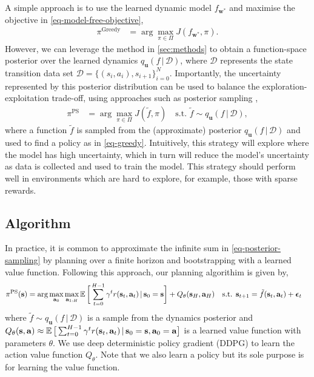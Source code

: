 \documentclass{article}
\newcommand{\state}{\ensuremath{\mathbf{s}}}
\newcommand{\action}{\ensuremath{\mathbf{a}}}
\newcommand{\noise}{\ensuremath{\bm\epsilon}}
\newcommand{\dataset}{\ensuremath{\mathcal{D}}}
\newcommand{\Horizon}{\ensuremath{H}}
\newcommand{\transitionFn}{\ensuremath{f}}
\newcommand{\policy}{\ensuremath{\pi}}
\renewcommand{\mid}{\,|\,}
\begin{document}
A simple approach is to use the learned dynamic model $f_{\mathbf{w}^{*}}$ and maximise the objective in \cref{eq-model-free-objective},
\begin{align} \label{eq-greedy}
  \policy^{\text{Greedy}} &= \arg \max_{\pi \in \Pi} J(f_{\mathbf{w}^{*}}, \pi).
\end{align}
However, we can leverage the method in \cref{sec:methods} to obtain a function-space posterior over the learned dynamics $q_{\mathbf{u}}(\transitionFn \mid \dataset)$,
where $\mathcal{D}$ represents the state transition data set \(\mathcal{D} = \{(s_{i},a_{i}), s_{i+1}\}_{i=0}^{N}\).
Importantly, the uncertainty represented by this posterior distribution can be used to balance the exploration-exploitation trade-off,
using approaches such as posterior sampling \cite{osbandWhyPosteriorSampling2017,osbandMoreEfficientReinforcement2013},
\begin{align} \label{eq-posterior-sampling}
  \policy^{\text{PS}} &= \arg \max_{\pi \in \Pi} J(\tilde{f}, \pi)
\quad \text{s.t. } \tilde{\transitionFn} \sim q_{\mathbf{u}}({\transitionFn} \mid \dataset),
\end{align}
where a function $\tilde{\transitionFn}$ is sampled from the (approximate) posterior $q_{\mathbf{u}}({\transitionFn} \mid \dataset)$ and used to find a policy as
in \cref{eq-greedy}.
Intuitively, this strategy will explore where the model has high uncertainty, which in turn will reduce the model's uncertainty as data is collected and used to
train the model.
This strategy should perform well in environments which are hard to explore, for example, those
with sparse rewards.



\subsection{Algorithm}
In practice, it is common to approximate the infinite sum in \cref{eq-posterior-sampling}
by planning over a finite
horizon and bootstrapping with a learned value function.
Following this approach, our planning algorithim is given by,
\begin{align} \label{eq-fast-update-mpc}
  \policy^{\text{PS}}(\state) = \arg \max_{\action_{0}} \max_{\action_{1:\Horizon}}
\E \bigg[ \sum_{t=0}^{H-1} \gamma^{t} r(\state_{t},\action_{t}) \mid \state_{0}=\state  \bigg] + Q_{\theta}(\state_{\Horizon}, \action_{H})
\quad \text{s.t. } \state_{t+1} &= \tilde{\transitionFn}(\state_{t}, \action_{t}) + \noise_{t}
\end{align}
where $\tilde{\transitionFn} \sim q_{\mathbf{u}}(\transitionFn \mid \dataset)$ is a sample from the
dynamics posterior and
${Q_{\theta}(\state, \action) \approx \E \big[ \sum_{t=0}^{H-1} \gamma^{t} r(\state_{t},\action_{t}) \mid \state_{0}=\state, \action_{0}=\action  \big]}$
is a learned value function with parameters $\theta$.
We use deep deterministic policy gradient (DDPG) \cite{lillicrapContinuousControlDeep2016} to learn the action value function $Q_{\theta}$.
Note that we also learn a policy but its sole purpose is for learning the value function.
\end{document}
